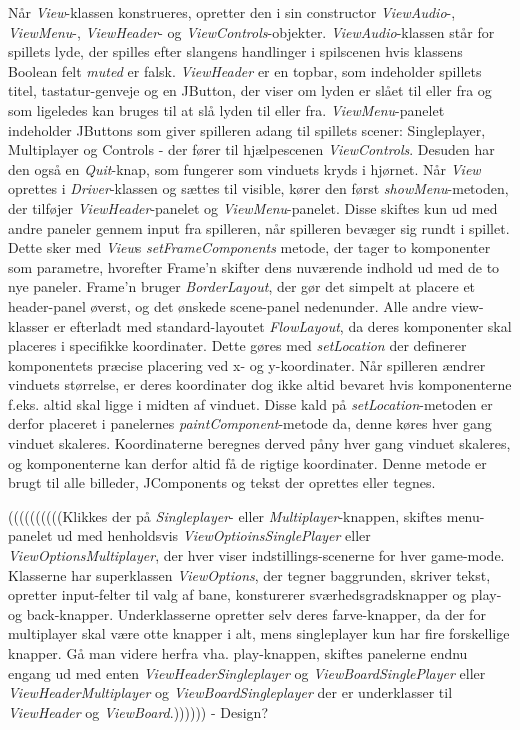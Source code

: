 \documentclass{report}
\begin{document}
Når \textit{View}-klassen konstrueres, opretter den i sin constructor \textit{ViewAudio}-, \textit{ViewMenu}-, \textit{ViewHeader}- og \textit{ViewControls}-objekter. \textit{ViewAudio}-klassen står for spillets lyde, der spilles efter slangens handlinger i spilscenen hvis klassens Boolean felt \textit{muted} er falsk. \textit{ViewHeader} er en topbar, som indeholder spillets titel, tastatur-genveje og en JButton, der viser om lyden er slået til eller fra og som ligeledes kan bruges til at slå lyden til eller fra. \textit{ViewMenu}-panelet indeholder JButtons som giver spilleren adang til spillets scener: Singleplayer, Multiplayer og Controls - der fører til hjælpescenen \textit{ViewControls}. Desuden har den også en \textit{Quit}-knap, som fungerer som vinduets kryds i hjørnet. Når \textit{View} oprettes i \textit{Driver}-klassen og sættes til visible, kører den først \textit{showMenu}-metoden, der tilføjer \textit{ViewHeader}-panelet og \textit{ViewMenu}-panelet. Disse skiftes kun ud med andre paneler gennem input fra spilleren, når spilleren bevæger sig rundt i spillet. Dette sker med \textit{View}s \textit{setFrameComponents} metode, der tager to komponenter som parametre, hvorefter Frame'n skifter dens nuværende indhold ud med de to nye paneler. Frame'n bruger \textit{BorderLayout}, der gør det simpelt at placere et header-panel øverst, og det ønskede scene-panel nedenunder. Alle andre view-klasser er efterladt med standard-layoutet \textit{FlowLayout}, da deres komponenter skal placeres i specifikke koordinater. Dette gøres med \textit{setLocation} der definerer komponentets præcise placering ved x- og y-koordinater. Når spilleren ændrer vinduets størrelse, er deres koordinater dog ikke altid bevaret hvis komponenterne f.eks. altid skal ligge i midten af vinduet. Disse kald på \textit{setLocation}-metoden er derfor placeret i panelernes \textit{paintComponent}-metode da, denne køres hver gang vinduet skaleres. Koordinaterne beregnes derved påny hver gang vinduet skaleres, og komponenterne kan derfor altid få de rigtige koordinater. Denne metode er brugt til alle billeder, JComponents og tekst der oprettes eller tegnes.

((((((((((Klikkes der på \textit{Singleplayer}- eller \textit{Multiplayer}-knappen, skiftes menu-panelet ud med henholdsvis \textit{ViewOptioinsSinglePlayer} eller \textit{ViewOptionsMultiplayer}, der hver viser indstillings-scenerne for hver game-mode. Klasserne har superklassen \textit{ViewOptions}, der tegner baggrunden, skriver tekst, opretter input-felter til valg af bane, konsturerer sværhedsgradsknapper og play- og back-knapper. Underklasserne opretter selv deres farve-knapper, da der for multiplayer skal være otte knapper i alt, mens singleplayer kun har fire forskellige knapper. Gå man videre herfra vha. play-knappen, skiftes panelerne endnu engang ud med enten \textit{ViewHeaderSingleplayer} og \textit{ViewBoardSinglePlayer} eller \textit{ViewHeaderMultiplayer} og \textit{ViewBoardSingleplayer} der er underklasser til \textit{ViewHeader} og \textit{ViewBoard}.)))))) - Design?
\end{document}
